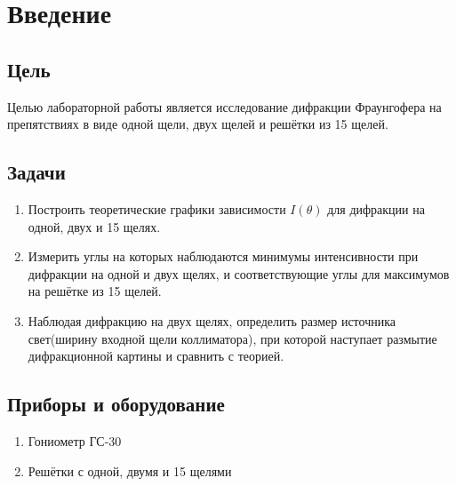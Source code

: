 \section{Введение}
\subsection*{Цель} 
Целью лабораторной работы является исследование дифракции Фраунгофера на препятствиях в виде одной щели, двух щелей и решётки из 15
щелей.

\subsection*{Задачи} 
\begin{enumerate}
	
	\item Построить теоретические графики зависимости $I(\theta)$ для дифракции на одной, двух и 15 щелях.
	\item Измерить углы на которых наблюдаются минимумы интенсивности при дифракции на одной и двух щелях, и соответствующие углы для максимумов на решётке из 15 щелей.
	\item Наблюдая дифракцию на двух щелях, определить размер источника свет(ширину входной щели коллиматора), при которой наступает размытие дифракционной картины и сравнить с теорией.
	
\end{enumerate}


\subsection*{Приборы и оборудование} 
\begin{enumerate}
	\item Гониометр ГС-30
	\item Решётки с одной, двумя и 15 щелями
\end{enumerate}